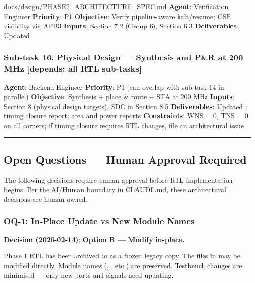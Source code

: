 \begin{relocated}{docs/design/PHASE2_ARCHITECTURE_SPEC.md}
\textbf{Agent}: Verification Engineer \textbf{Priority}: P1
\textbf{Objective}: Verify pipeline-aware halt/\allowbreak{}resume; CSR
visibility via APB3 \textbf{Inputs}: Section 7.2 (Group 6), Section 6.3
\textbf{Deliverables}: Updated

\subsubsection{Sub-task 16: Physical Design --- Synthesis and P\&R at
200 MHz {[}depends: all RTL sub-tasks{]}}\label{ds:ch:phase2-architecture:sub-task-16-physical-design-synthesis-and-pr-at-200-mhz-depends-all-rtl-sub-tasks}

\textbf{Agent}: Backend Engineer \textbf{Priority}: P1 (can overlap with
sub-task 14 in parallel) \textbf{Objective}: Synthesis + place \& route
+ STA at 200 MHz \textbf{Inputs}: Section 8 (physical design targets),
SDC in Section 8.5 \textbf{Deliverables}: Updated
; timing closure report; area and
power reports \textbf{Constraints}: WNS = 0, TNS = 0 on all corners; if
timing closure requires RTL changes, file an architectural issue

\begin{center}\rule{0.5\linewidth}{0.5pt}\end{center}

\subsection{Open Questions --- Human Approval Required}\label{ds:ch:phase2-architecture:10-open-questions-human-approval-required}

The following decisions require human approval before RTL implementation
begins. Per the AI/Human boundary in CLAUDE.md, these architectural
decisions are human-owned.

\subsubsection{OQ-1: In-Place Update vs New Module Names}\label{ds:ch:phase2-architecture:oq-1-in-place-update-vs-new-module-names}

\textbf{Decision (2026-02-14)}: \ok{} \textbf{Option B --- Modify
in-place.}

Phase 1 RTL has been archived to  as a frozen legacy
copy. The files in  may be modified directly. Module names
(, , etc.) are preserved. Testbench
changes are minimised --- only new ports and signals need updating.


\end{relocated}
